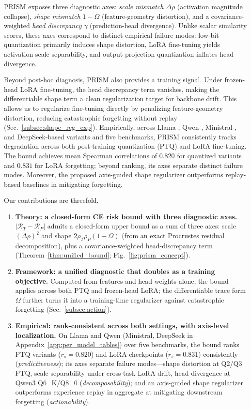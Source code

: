 PRISM exposes three diagnostic axes: \emph{scale mismatch} $\Delta \rho$ (activation magnitude collapse), \emph{shape mismatch} $1-\Omega$ (feature-geometry distortion), and a covariance-weighted \emph{head discrepancy} $\gamma$ (prediction-head divergence). Unlike scalar similarity scores, these axes correspond to distinct empirical failure modes: low-bit quantization primarily induces shape distortion, LoRA fine-tuning yields activation scale separability, and output-projection quantization inflates head divergence.

Beyond post-hoc diagnosis, PRISM also provides a training signal. Under frozen-head LoRA fine-tuning, the head discrepancy term vanishes, making the differentiable shape term a clean regularization target for backbone drift. This allows us to regularize fine-tuning directly by penalizing feature-geometry distortion, reducing catastrophic forgetting without replay (Sec.~\ref{subsec:shape_reg_exp}).
Empirically, across Llama-, Qwen-, Ministral-, and DeepSeek-based variants and five benchmarks, PRISM consistently tracks degradation across both post-training quantization (PTQ) and LoRA fine-tuning. The bound achieves mean Spearman correlations of $0.820$ for quantized variants and $0.831$ for LoRA forgetting; beyond ranking, its axes separate distinct failure modes. Moreover, the proposed axis-guided shape regularizer outperforms replay-based baselines in mitigating forgetting.

Our contributions are threefold.
\begin{enumerate}[leftmargin=24pt,itemsep=2pt, topsep=2pt]
    \item \textbf{Theory: a closed-form CE risk bound with three diagnostic axes.} $|\mathcal{R}_T - \mathcal{R}_P|$ admits a closed-form upper bound as a sum of three axes: scale $(\Delta\rho)^2$ and shape $2\rho_T\rho_P(1{-}\Omega)$ (from an exact Procrustes residual decomposition), plus a covariance-weighted head-discrepancy term (Theorem~\ref{thm:unified_bound}; Fig.~\ref{fig:prism_concept}).

    \item \textbf{Framework: a unified diagnostic that doubles as a training objective.} Computed from features and head weights alone, the bound applies across both PTQ and frozen-head LoRA; the differentiable trace form $\Omega$ further turns it into a training-time regularizer against catastrophic forgetting (Sec.~\ref{subsec:action}).

    \item \textbf{Empirical: rank-consistent across both settings, with axis-level localization.} On Llama and Qwen (Ministral, DeepSeek in Appendix~\ref{app:per_model_tables}) over five benchmarks, the bound ranks PTQ variants ($r_s{=}0.820$) and LoRA checkpoints ($r_s{=}0.831$) consistently (\emph{predictiveness}); its axes separate failure modes---shape distortion at Q2/Q3 PTQ, scale separability under cross-task LoRA drift, head divergence at Qwen3 Q6\_K/Q8\_0 (\emph{decomposability}); and an axis-guided shape regularizer outperforms experience replay in aggregate at mitigating downstream forgetting (\emph{actionability}).
\end{enumerate}



